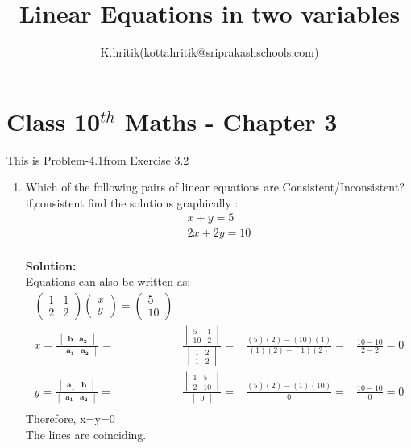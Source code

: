 \documentclass[12pt]{article}
\title{Linear Equations in two variables }
\author{K.hritik(kottahritik@sriprakashschools.com)}
\newcommand{\myvec}[1]{\ensuremath{\begin{pmatrix}#1\end{pmatrix}}}
\newcommand{\mydet}[1]{\ensuremath{\begin{vmatrix}#1\end{vmatrix}}}
\newcommand{\solution}{\noindent \textbf{Solution: }}
\let\vec\mathbf
\begin{document}
\maketitle
\section*{Class 10$^{th}$ Maths - Chapter 3}
This is Problem-4.1from Exercise 3.2
\begin{enumerate}
\item Which of the following pairs of linear equations are Consistent/Inconsistent?if,consistent find the solutions graphically :\\
\begin{align}
    x+y=5\\
         2x+2y=10 \\ 
\end{align}
      
\solution \\
            Equations  can also be written as:\\     
\begin{align}
\myvec{1&1\\2&2}\myvec{x\\y} = \myvec{5\\10}\\
x=\frac{\mydet{ \vec{b} & \vec{a_2}}}{\mydet{ \vec{a_1} &\vec{a_2} }} =&
\frac{\mydet{ 5 & 1 \\ 10 & 2 }}{\mydet{1&2\\1&2}} =&
\frac{(5)(2)-(10)(1)}{(1)(2)-(1)(2)} =&
\frac{10-10}{2-2} = 0 \\
y=\frac{\mydet{\vec{a_1}&\vec{b}}}{\mydet{\vec{a_1}&\vec{a_2}}} =&
\frac{\mydet{1&5\\2&10}}{\mydet{0}} =&
\frac{(5)(2)-(1)(10)}{0} =&
\frac{10-10}{0} = 0\\
\end{align}
Therefore, x=y=0\\The lines are coinciding.

	

\end{enumerate}
\end{document}
